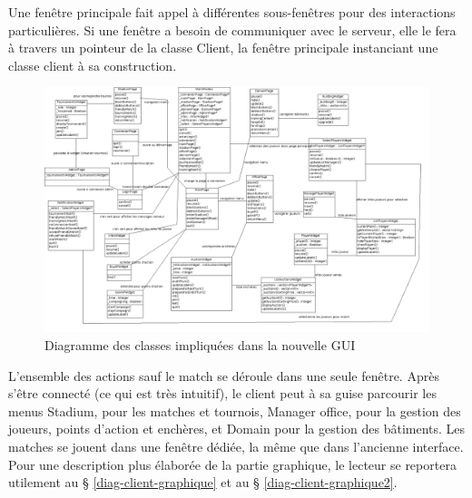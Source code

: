 \documentclass[a4paper,titlepage]{scrreprt}
\begin{document}
         Une fenêtre principale fait appel à différentes sous-fenêtres pour des interactions particulières.
         Si une fenêtre a besoin de communiquer avec le serveur, elle le fera à travers un pointeur de la classe Client,
         la fenêtre principale instanciant une classe client à sa construction.\\
        
      \begin{landscape}
      \begin{figure}[H]
          \center
          \includegraphics[scale=0.35]{uml/class/NewGUI.png}
         \caption{Diagramme des classes impliquées dans la nouvelle GUI}
      \end{figure}
      \end{landscape}
         
         L'ensemble des actions sauf le match se déroule dans une seule fenêtre. Après s'être connecté (ce qui est très intuitif), le client peut à sa guise parcourir les menus Stadium, pour les matches et tournois, Manager office, pour la gestion des joueurs, points d'action et enchères, et Domain pour la gestion des bâtiments. Les matches se jouent dans une fenêtre dédiée, la même que dans l'ancienne interface.\\
     
    Pour une description plus élaborée de la partie graphique, le lecteur se reportera utilement au § \ref{diag-client-graphique} et au § \ref{diag-client-graphique2}.
    
\end{document}
